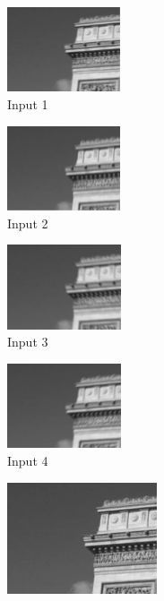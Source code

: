 \documentclass[a4paper,10pt]{report}
\begin{document}
\begin{figure}[h]
 
\begin{subfigure}{0.24\textwidth}
\includegraphics[width=0.9\linewidth, height=2.5cm]{ressource/detail_flou1.png} 
\caption{Input 1}
\label{fig:Flou1}
\end{subfigure}
\begin{subfigure}{0.24\textwidth}
\includegraphics[width=0.9\linewidth, height=2.5cm]{ressource/detail_flou2.png}
\caption{Input 2}
\label{fig:Flou2}
\end{subfigure}
\begin{subfigure}{0.24\textwidth}
\includegraphics[width=0.9\linewidth, height=2.5cm]{ressource/detail_flou3.png}
\caption{Input 3}
\label{fig:Flou3}
\end{subfigure}
\begin{subfigure}{0.24\textwidth}
\includegraphics[width=0.9\linewidth, height=2.5cm]{ressource/detail_flou4.png}
\caption{Input 4}
\label{fig:Flou4}
\end{subfigure}
\begin{subfigure}{0.32\textwidth}
\includegraphics[width=0.9\linewidth, height=3.3cm]{ressource/detail_orig.png}

\end{subfigure}
\end{figure}
\end{document}

